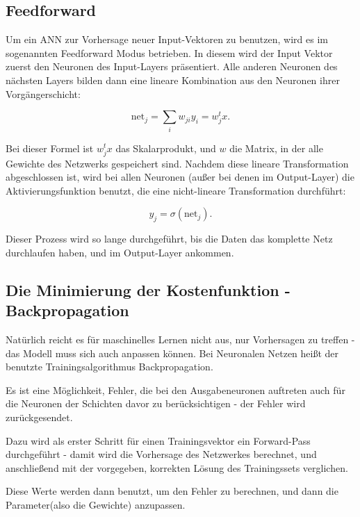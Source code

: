 \subsection{Feedforward}
Um ein ANN zur Vorhersage neuer Input-Vektoren zu benutzen, wird es im sogenannten Feedforward Modus betrieben. In diesem wird der Input Vektor zuerst den Neuronen des Input-Layers präsentiert. Alle anderen Neuronen des nächsten Layers bilden dann eine lineare Kombination aus den Neuronen ihrer Vorgängerschicht: 

\begin{equation}
\label{eq:feedforward1}
\text{net}_j = \sum_{i} w_{ji} y_i = w_j^t x.
\end{equation}

Bei dieser Formel ist $w_j^t x$ das Skalarprodukt, und $w$ die Matrix, in der alle Gewichte des Netzwerks gespeichert sind.  
Nachdem diese lineare Transformation abgeschlossen ist, wird bei allen Neuronen (außer bei denen im Output-Layer) die Aktivierungsfunktion benutzt, die eine nicht-lineare Transformation durchführt: 

\begin{equation}
\label{eq:feedforward2}
y_j = \sigma (\text{net}_j).
\end{equation}

Dieser Prozess wird so lange durchgeführt, bis die Daten das komplette Netz durchlaufen haben, und im Output-Layer ankommen\cite{bishop1995neural}.


\subsection{Die Minimierung der Kostenfunktion - Backpropagation}

Natürlich reicht es für maschinelles Lernen nicht aus, nur Vorhersagen zu treffen - das Modell muss sich auch anpassen können. Bei Neuronalen Netzen heißt der benutzte Trainingsalgorithmus Backpropagation.

Es ist eine Möglichkeit, Fehler, die bei den Ausgabeneuronen auftreten auch für die Neuronen der Schichten davor zu berücksichtigen - der Fehler wird zurückgesendet.

Dazu wird als erster Schritt für einen Trainingsvektor ein Forward-Pass durchgeführt - damit wird die Vorhersage des Netzwerkes berechnet, und anschließend mit der vorgegeben, korrekten Lösung des Trainingssets verglichen.

Diese Werte werden dann benutzt, um den Fehler zu berechnen, und dann die Parameter(also die Gewichte) anzupassen.


